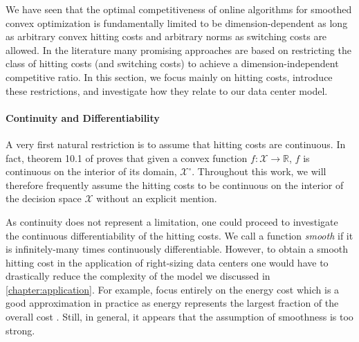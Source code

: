 We have seen that the optimal competitiveness of online algorithms for smoothed convex optimization is fundamentally limited to be dimension-dependent as long as arbitrary convex hitting costs and arbitrary norms as switching costs are allowed. In the literature many promising approaches are based on restricting the class of hitting costs (and switching costs) to achieve a dimension-independent competitive ratio. In this section, we focus mainly on hitting costs, introduce these restrictions, and investigate how they relate to our data center model.

\paragraph{Continuity and Differentiability} A very first natural restriction is to assume that hitting costs are continuous. In fact, theorem 10.1 of \cite{Rockafellar1970} proves that given a convex function $f : \mathcal{X} \to \mathbb{R}$, $f$ is continuous on the interior of its domain, $\mathcal{X}^{\circ}$. Throughout this work, we will therefore frequently assume the hitting costs to be continuous on the interior of the decision space $\mathcal{X}$ without an explicit mention.

As continuity does not represent a limitation, one could proceed to investigate the continuous differentiability of the hitting costs. We call a function \emph{smooth} if it is infinitely-many times continuously differentiable. However, to obtain a smooth hitting cost in the application of right-sizing data centers one would have to drastically reduce the complexity of the model we discussed in \autoref{chapter:application}. For example, \citeauthor*{Bansal2015} focus entirely on the energy cost which is a good approximation in practice as energy represents the largest fraction of the overall cost \cite{Bansal2015}. Still, in general, it appears that the assumption of smoothness is too strong.
